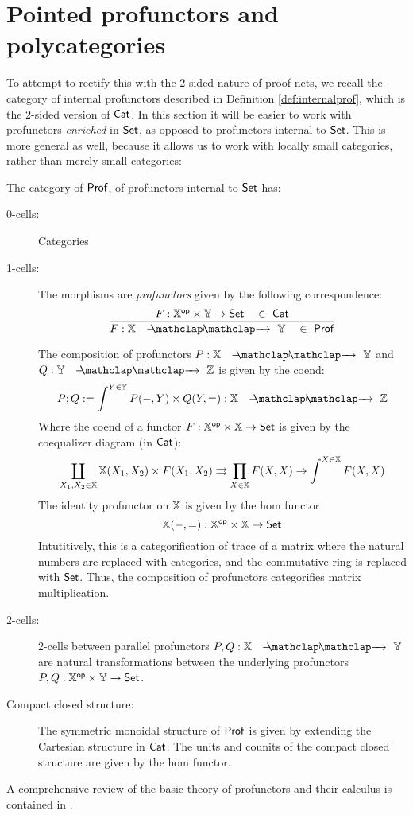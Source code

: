 \section{Pointed profunctors and polycategories}
To attempt to rectify this with the 2-sided nature of proof nets, we recall the category of internal profunctors described in Definition \ref{def:internalprof}, which is the 2-sided version of ${\sf Cat}$.  In this section it will be easier to work with profunctors {\em enriched} in $\mathsf{Set}$, as opposed to profunctors internal to $\mathsf{Set}$.  This is more general as well, because it allows us to work with locally small categories, rather than merely small categories:
\begin{definition}
The category of ${\sf Prof}$, of profunctors internal to $\mathsf{Set}$ has:
\begin{description}
\item[0-cells:] Categories
\item[1-cells:]  The morphisms are {\em profunctors} given by the following correspondence:
$$
\dfrac
{F:\X^\op\times\Y\to\Sets \quad \in\ \Cat}
{F:\X\proarrow \Y\quad \in\ \Prof}
$$

The composition of profunctors $P:\X\proarrow \Y$ and $Q:\Y\proarrow \Z$ is given by the coend:
$$
P;Q := \int^{Y \in \Y } P(-,Y) \times Q(Y,=):\X \proarrow \Z
$$
Where the coend of a functor $F:\mathbb{X}^{\mathsf{op}}\times\mathbb{X}\to \mathsf{Set}$ is given by the coequalizer diagram (in ${\sf Cat}$):
$$
\coprod_{X_1,X_2 \in \mathbb{X}} {\mathbb{X}}(X_1,X_2) \times F(X_1,X_2) \rightrightarrows \prod_{X \in \mathbb{X}} F(X,X) \to \int^{X \in \mathbb{X}} F(X,X)
$$
The identity profunctor on $\mathbb{X}$ is given by the hom functor
$$\mathbb{X}(-,=): \mathbb{X}^{\mathsf{op}}\times\mathbb{X}\to\mathsf{Set}$$
Intutitively, this is a categorification of trace of a matrix where the natural numbers are replaced with categories, and the commutative ring is replaced with $\mathsf{Set}$.  Thus, the composition of profunctors categorifies matrix multiplication.
\item[2-cells:]  2-cells between parallel profunctors $P,Q:\X\proarrow \Y$ are natural transformations between the underlying profunctors $P,Q:\mathbb{X}^{\mathsf{op}}\times \mathbb{Y} \to \mathsf{Set}$.
\item[Compact closed structure:] The symmetric monoidal structure of ${\sf Prof}$ is given by extending the Cartesian structure in ${\sf Cat}$.   The units and counits of the compact closed structure are given by the hom functor.
\end{description}
\end{definition}
A comprehensive review of the basic theory of profunctors and their calculus is contained in \cite{fosco}.
